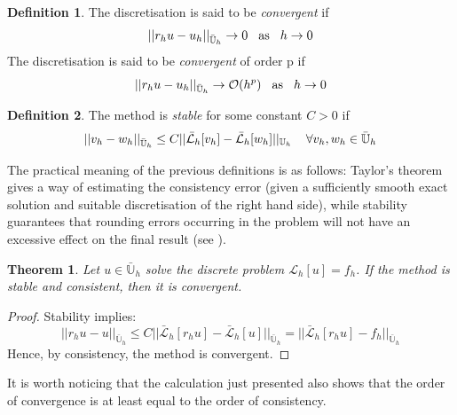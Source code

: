 \documentclass[11pt]{article}
\theoremstyle{theorem}
\newtheorem{theorem}{Theorem}
\theoremstyle{definition}
\newtheorem{definition}{Definition}
\begin{document}
\begin{definition}
	The discretisation is said to be \emph{convergent} if 
	\begin{equation}
	\label{eqn:convergent}
	||r_h u-u_h||_{{\bar{\mathbb{U}}}_h}\rightarrow 0\hspace{3mm}\text{as}\hspace{3mm}h\rightarrow 0
	\end{equation}
	The discretisation is said to be \emph{convergent} of order p if 
	\begin{equation}
	\label{eqn:convergent-p}
	||r_h u-u_h||_{{\bar{\mathbb{U}}}_h}\rightarrow \mathcal{O}(h^p)\hspace{3mm}\text{as}\hspace{3mm}h\rightarrow 0
	\end{equation}
\end{definition}

\begin{definition}
	The method is \emph{stable} for some constant $C>0$ if
	\begin{equation}
	\label{eqn:stable}
	||v_h - w_h||_{{\bar{\mathbb{U}}}_h}\le C||\bar{\mathcal{L}}_h[v_h]-\bar{\mathcal{L}}_h[w_h]||_{{{\mathbb{U}}}_h}\hspace{4mm} \forall v_h,w_h\in\bar{\mathbb{U}}_h
	\end{equation}
\end{definition}

The practical meaning of the previous definitions is as follows: Taylor’s theorem gives a way of estimating the consistency error (given a sufficiently smooth exact solution and suitable discretisation of the right hand side), while stability guarantees that rounding errors occurring in the problem will not have an excessive effect on the final result (see \cite{lec-notes}).

\begin{theorem}
	\label{thm:stab-conv}
	Let $u\in\bar{\mathbb{U}}_h$ solve the discrete problem $\mathcal{L}_h[u]=f_h$. If the method is stable and consistent, then it is convergent. 
\end{theorem}
\begin{proof}
	Stability implies:
	$$||r_hu-u||_{{\bar{\mathbb{U}}}_h}\le C ||\bar{\mathcal{L}}_h[r_hu]-\bar{\mathcal{L}}_h[u]||_{{\bar{\mathbb{U}}}_h}=||\bar{\mathcal{L}}_h[r_hu]-f_h||_{{\bar{\mathbb{U}}}_h}$$
	Hence, by consistency, the method is convergent.
\end{proof}

It is worth noticing that the calculation just presented also shows that the order of convergence is at least equal to the order of consistency.\\
\end{document}
